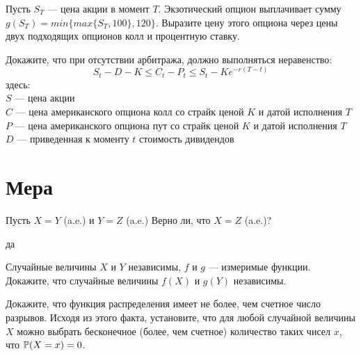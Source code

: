 \begin{problem}
 Пусть $S_{T}$ — цена акции в момент $T$. Экзотический опцион выплачивает сумму $g(S_{T})=min\{max\{S_{T},100\},120\}$. Выразите цену этого опциона через цены двух подходящих опционов колл и процентную ставку.

\begin{sol}

\end{sol}
\end{problem}

\begin{problem}
Докажите, что при отсутствии арбитража, должно выполняться неравенство:
\[
S_{t}-D-K\le C_{t}-P_{t}\le S_{t}-Ke^{-r(T-t)}
\]
здесь:\\

$S$ — цена акции \\
$C$ — цена американского опциона колл со страйк ценой $K$ и датой исполнения $T$\\
$P$ — цена американского опциона пут со страйк ценой $K$ и датой исполнения $T$\\
$D$ — приведенная к моменту $t$ стоимость дивидендов

\begin{sol}
\end{sol}
\end{problem}



\section{Мера}

\begin{problem}
Пусть $X=Y$ (a.e.) и $Y=Z$ (a.e.) Верно ли, что $X=Z$ (a.e.)?

\begin{sol}
да
\end{sol}
\end{problem}

\begin{problem}
Случайные величины $X$ и $Y$ независимы, $f$ и $g$ — измеримые
функции. Докажите, что случайные величины $f(X)$ и $g(Y)$ независимы.

\begin{sol}

\end{sol}
\end{problem}

\begin{problem}
Докажите, что функция распределения имеет не более, чем счетное
число разрывов. Исходя из этого факта, установите, что для любой
случайной величины $X$ можно выбрать бесконечное (более, чем
счетное) количество таких чисел $x$, что $\P(X=x)=0$.

\begin{sol}

\end{sol}
\end{problem}

